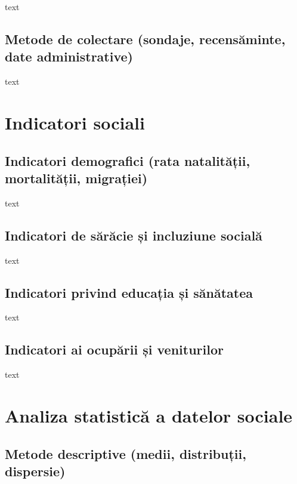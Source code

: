 \documentclass[
  11pt,
  b5paper,
  nottoc]{book}
\begin{document}
text

\subsection{Metode de colectare (sondaje, recensăminte, date
administrative)}\label{metode-de-colectare-sondaje-recensux103minte-date-administrative}

text

\section{Indicatori sociali}\label{indicatori-sociali}

\subsection{Indicatori demografici (rata natalității, mortalității,
migrației)}\label{indicatori-demografici-rata-natalitux103ux21bii-mortalitux103ux21bii-migraux21biei}

text

\subsection{Indicatori de sărăcie și incluziune
socială}\label{indicatori-de-sux103rux103cie-ux219i-incluziune-socialux103}

text

\subsection{Indicatori privind educația și
sănătatea}\label{indicatori-privind-educaux21bia-ux219i-sux103nux103tatea}

text

\subsection{Indicatori ai ocupării și
veniturilor}\label{indicatori-ai-ocupux103rii-ux219i-veniturilor}

text

\section{Analiza statistică a datelor
sociale}\label{analiza-statisticux103-a-datelor-sociale}

\subsection{Metode descriptive (medii, distribuții,
dispersie)}\label{metode-descriptive-medii-distribuux21bii-dispersie}
\end{document}
